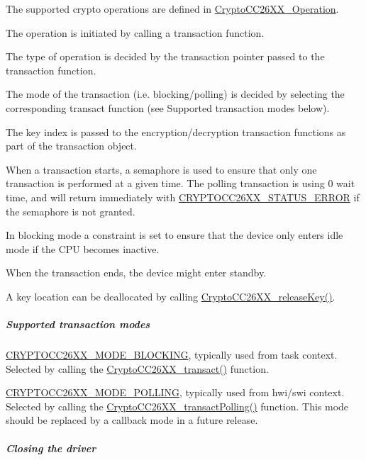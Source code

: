 \begin{DoxyItemize}
\item The supported crypto operations are defined in \hyperlink{_crypto_c_c26_x_x_8h_a28465385e5b45efecc00f2015605f970}{Crypto\+C\+C26\+X\+X\+\_\+\+Operation}.
\item The operation is initiated by calling a transaction function.
\item The type of operation is decided by the transaction pointer passed to the transaction function.
\item The mode of the transaction (i.\+e. blocking/polling) is decided by selecting the corresponding transact function (see Supported transaction modes below).
\item The key index is passed to the encryption/decryption transaction functions as part of the transaction object.
\item When a transaction starts, a semaphore is used to ensure that only one transaction is performed at a given time. The polling transaction is using 0 wait time, and will return immediately with \hyperlink{_crypto_c_c26_x_x_8h_a077508dd42d5999244911edc61f63194}{C\+R\+Y\+P\+T\+O\+C\+C26\+X\+X\+\_\+\+S\+T\+A\+T\+U\+S\+\_\+\+E\+R\+R\+O\+R} if the semaphore is not granted.
\item In blocking mode a constraint is set to ensure that the device only enters idle mode if the C\+P\+U becomes inactive.
\item When the transaction ends, the device might enter standby.
\item A key location can be deallocated by calling \hyperlink{_crypto_c_c26_x_x_8h_aa995ee20d8a7fcce66aeae86fee83555}{Crypto\+C\+C26\+X\+X\+\_\+release\+Key()}.
\end{DoxyItemize}\subparagraph*{Supported transaction modes}


\begin{DoxyItemize}
\item \hyperlink{_crypto_c_c26_x_x_8h_abf86c8ac428559f00fed3299d439e2cdaf0a9faf35a12d014c5f3a475906a3373}{C\+R\+Y\+P\+T\+O\+C\+C26\+X\+X\+\_\+\+M\+O\+D\+E\+\_\+\+B\+L\+O\+C\+K\+I\+N\+G}, typically used from task context. Selected by calling the \hyperlink{_crypto_c_c26_x_x_8h_a6864191d34a9a3cfbcd36cc34570b3b8}{Crypto\+C\+C26\+X\+X\+\_\+transact()} function.
\item \hyperlink{_crypto_c_c26_x_x_8h_abf86c8ac428559f00fed3299d439e2cda015c9e0e35350eb92ede6ad4109fa50b}{C\+R\+Y\+P\+T\+O\+C\+C26\+X\+X\+\_\+\+M\+O\+D\+E\+\_\+\+P\+O\+L\+L\+I\+N\+G}, typically used from hwi/swi context. Selected by calling the \hyperlink{_crypto_c_c26_x_x_8h_a2efbef5e059c752e1f5797a4ef3713a3}{Crypto\+C\+C26\+X\+X\+\_\+transact\+Polling()} function. This mode should be replaced by a callback mode in a future release.
\end{DoxyItemize}\subparagraph*{Closing the driver}

